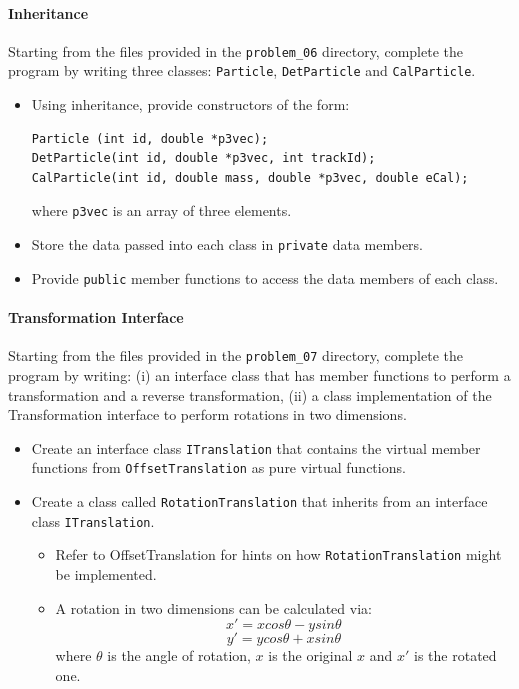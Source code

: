 \documentclass[11pt,a4paper]{scrartcl}
\begin{document}
\paragraph{Inheritance}
Starting from the files provided in the \texttt{problem\_06} directory,
complete the program by writing three classes: \texttt{Particle},
\texttt{DetParticle} and \texttt{CalParticle}.

\begin{itemize}
\item Using inheritance, provide constructors of the form:
\begin{verbatim}
Particle (int id, double *p3vec);
DetParticle(int id, double *p3vec, int trackId);
CalParticle(int id, double mass, double *p3vec, double eCal);
\end{verbatim}
where \texttt{p3vec} is an array of three elements.

\item Store the data passed into each class in \texttt{private} data members.

\item Provide \texttt{public} member functions to access the data
members of each class.
\end{itemize}


\paragraph{Transformation Interface}
Starting from the files provided in the \texttt{problem\_07} directory,
complete the program by writing: (i) an interface class that has
member functions to perform a transformation and a reverse
transformation, (ii) a class implementation of the Transformation
interface to perform rotations in two dimensions.

\begin{itemize}
\item Create an interface class \texttt{ITranslation} that contains the virtual
member functions from \texttt{OffsetTranslation} as pure virtual functions.
\item Create a class called \texttt{RotationTranslation} that inherits from an
interface class \texttt{ITranslation}.
\begin{itemize}
\item Refer to OffsetTranslation for hints on
how \texttt{RotationTranslation} might be implemented.
\item A rotation in two dimensions can be calculated via:
\[ x' = x cos \theta - y sin \theta \]
\[ y' = y cos \theta + x sin \theta \]
where $\theta$ is the angle of rotation, $x$ is the original $x$ and
$x'$ is the rotated one.
\end{itemize}
\end{itemize}
\end{document}
